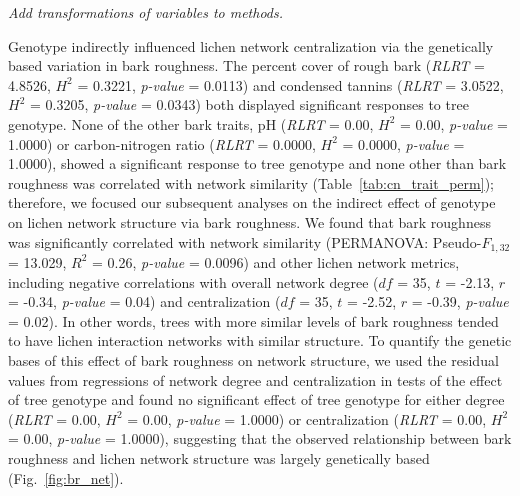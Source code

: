 \documentclass[11pt,twocolumn,twoside,lineno]{pnas-new}
\begin{document}
\textit{Add transformations of variables to methods.}

Genotype indirectly influenced lichen network centralization via the
genetically based variation in bark roughness. The percent cover of
rough bark (\textit{RLRT} = 4.8526, $H^2$ = 0.3221, \textit{p-value} =
0.0113) and condensed tannins (\textit{RLRT} = 3.0522, $H^2$ = 0.3205,
\textit{p-value} = 0.0343) both displayed significant responses to
tree genotype. None of the other bark traits, pH (\textit{RLRT} =
0.00, $H^2$ = 0.00, \textit{p-value} = 1.0000) or carbon-nitrogen
ratio (\textit{RLRT} = 0.0000, $H^2$ = 0.0000, \textit{p-value} =
1.0000), showed a significant response to tree genotype and none other
than bark roughness was correlated with network similarity
(Table~\ref{tab:cn_trait_perm}); therefore, we focused our subsequent
analyses on the indirect effect of genotype on lichen network
structure via bark roughness. We found that bark roughness was
significantly correlated with network similarity (PERMANOVA:
Pseudo-$F_{1,32}$ = 13.029, $R^2$ = 0.26, \textit{p-value} = 0.0096)
and other lichen network metrics, including negative correlations with
overall network degree ($df$ = 35, $t$ = -2.13, $r$ = -0.34,
\textit{p-value} = 0.04) and centralization ($df$ = 35, $t$ = -2.52,
$r$ = -0.39, \textit{p-value} = 0.02). In other words, trees with more
similar levels of bark roughness tended to have lichen interaction
networks with similar structure. To quantify the genetic bases of this
effect of bark roughness on network structure, we used the residual
values from regressions of network degree and centralization in tests
of the effect of tree genotype and found no significant effect of tree
genotype for either degree (\textit{RLRT} = 0.00, $H^2$ = 0.00,
\textit{p-value} = 1.0000) or centralization (\textit{RLRT} = 0.00,
$H^2$ = 0.00, \textit{p-value} = 1.0000), suggesting that the observed
relationship between bark roughness and lichen network structure was
largely genetically based (Fig.~\ref{fig:br_net}).


\end{document}
